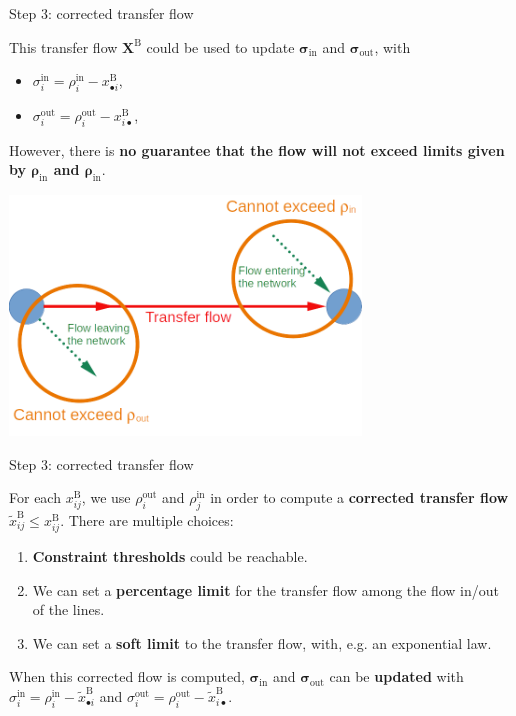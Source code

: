\documentclass[10pt]{beamer}
\newcommand{\imp}[1]{\textbf{\color{cyan}#1}}
\begin{document}
	\begin{frame}{Step 3: corrected transfer flow}
		
		This transfer flow $\mathbf{X}^\text{B}$ could be used to update $\bm{\sigma}_\text{in}$ and $\bm{\sigma}_\text{out}$, with 
		 
		\begin{itemize}
			\item $\sigma^\text{in}_i = \rho^\text{in}_i - x^\text{B}_{\bullet i}$,
			\item $\sigma^\text{out}_i = \rho^\text{out}_i - x^\text{B}_{i \bullet}$,
		\end{itemize}
		However, there is \imp{no guarantee that the flow will not exceed limits given by $\bm{\rho}_\text{in}$ and $\bm{\rho}_\text{in}$}.
		\begin{center}
			\includegraphics[width=0.7\textwidth]{img/flow_constrained.png}
		\end{center}
	\end{frame}
	
	
	\begin{frame}{Step 3: corrected transfer flow}
		
		For each $x^\text{B}_{ij}$, we use $\rho^\text{out}_i$ and $\rho^\text{in}_j$ in order to compute a \imp{corrected transfer flow} $\widetilde{x}_{ij}^\text{B} \leq x_{ij}^\text{B}$. There are multiple choices:
		
		\begin{enumerate}
			\item \imp{Constraint thresholds} could be reachable.
			\item We can set a \imp{percentage limit} for the transfer flow among the flow in/out of the lines.
			\item We can set a \imp{soft limit} to the transfer flow, with, e.g. an exponential law.
		\end{enumerate}
		
		When this corrected flow is computed, $\bm{\sigma}_\text{in}$ and $\bm{\sigma}_\text{out}$ can be \imp{updated} with $\sigma^\text{in}_i = \rho^\text{in}_i - \widetilde{x}^\text{B}_{\bullet i}$ and $\sigma^\text{out}_i = \rho^\text{out}_i - \widetilde{x}^\text{B}_{i \bullet}$.
		
	\end{frame}
	
\end{document}
